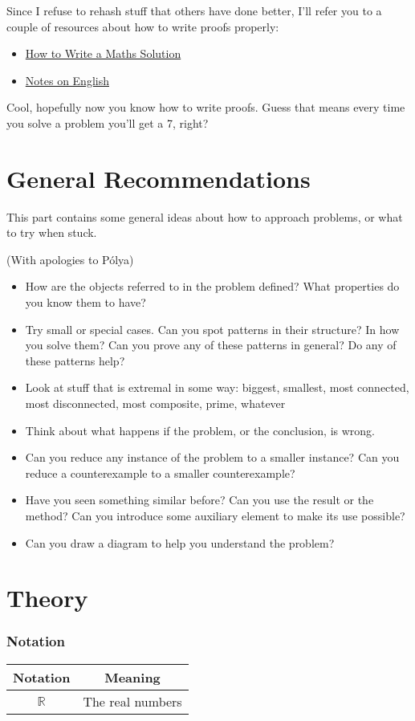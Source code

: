 \documentclass{amsart}
\newcommand{\Rr}{\mathbb{R}}
\begin{document}
Since I refuse to rehash stuff that others have done better, I'll refer you to a
couple of resources about how to write proofs properly:
\begin{itemize}
  \item
    \href{https://artofproblemsolving.com/news/articles/how-to-write-a-solution}
    {How to Write a Maths Solution}
  \item \href{https://web.evanchen.cc/handouts/english/english.pdf}{Notes on
    English}
\end{itemize}
Cool, hopefully now you know how to write proofs. Guess that means every time 
you solve a problem you'll get a 7, right?
\newpage
\part{General Recommendations}
This part contains some general ideas about how to approach problems, or what to
try when stuck.

(With apologies to P\'olya)
\begin{itemize}
  \item How are the objects referred to in the problem defined? What properties
    do you know them to have?
  \item Try small or special cases. Can you spot patterns in their structure? In
    how you solve them? Can you prove any of these patterns in general? Do any
    of these patterns help?
  \item Look at stuff that is extremal in some way: biggest, smallest, most
    connected, most disconnected, most composite, prime, whatever
  \item Think about what happens if the problem, or the conclusion, is wrong.
  \item Can you reduce any instance of the problem to a smaller instance? 
    Can you reduce a counterexample to a smaller counterexample?
  \item Have you seen something similar before? Can you use the result or the
    method? Can you introduce some auxiliary element to make its use possible?
  \item Can you draw a diagram to help you understand the problem?
\end{itemize}
\newpage
\part{Theory}
\setcounter{section}{-1}
\section{Notation}
\begin{center}
  \begin{tabular}{cc}
    \toprule
    Notation & Meaning \\ \midrule

    $\Rr$ & The real numbers \\

    \bottomrule
  \end{tabular}
\end{center}
\newpage
\end{document}
